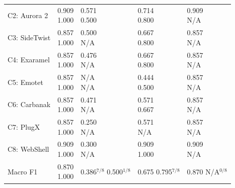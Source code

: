 \documentclass[pdflatex,sn-basic]{sn-jnl}
\begin{document}
\begin{table}[!t]
{\begin{tabularx}{\linewidth}{l*{4}{>{\centering\arraybackslash}X}}
C2: Aurora 2 & \ablationcell{0.909\\1.000} & \ablationcell{0.571\\0.500} & \ablationcell{0.714\\0.800} & \ablationcell{0.909\\N/A} \\
\rowcolor{black!6}
C3: SideTwist & \ablationcell{0.857\\1.000} & \ablationcell{0.500\\N/A} & \ablationcell{0.667\\0.800} & \ablationcell{0.857\\N/A} \\
C4: Exaramel & \ablationcell{0.857\\1.000} & \ablationcell{0.476\\N/A} & \ablationcell{0.667\\0.800} & \ablationcell{0.857\\N/A} \\
\rowcolor{black!6}
C5: Emotet & \ablationcell{0.857\\1.000} & \ablationcell{N/A\\N/A} & \ablationcell{0.444\\0.500} & \ablationcell{0.857\\N/A} \\
C6: Carbanak & \ablationcell{0.857\\1.000} & \ablationcell{0.471\\N/A} & \ablationcell{0.571\\0.667} & \ablationcell{0.857\\N/A} \\
\rowcolor{black!6}
C7: PlugX & \ablationcell{0.857\\1.000} & \ablationcell{0.250\\N/A} & \ablationcell{0.571\\N/A} & \ablationcell{0.857\\N/A} \\
C8: WebShell & \ablationcell{0.909\\1.000} & \ablationcell{0.300\\N/A} & \ablationcell{0.909\\1.000} & \ablationcell{0.909\\N/A} \\
\midrule
\rowcolor{black!6}
Macro F1 & \ablationcell{0.870\\1.000} & \ablationcell{0.386$^{7/8}$\\0.500$^{1/8}$} & \ablationcell{0.675\\0.795$^{7/8}$} & \ablationcell{0.870\\N/A$^{0/8}$} \\

\end{tabularx}}
\end{table}
\end{document}
